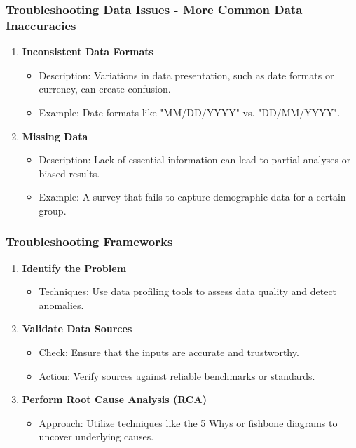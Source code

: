 \documentclass{beamer}
\begin{document}
\begin{frame}[fragile]
    \frametitle{Troubleshooting Data Issues - More Common Data Inaccuracies}
    \begin{enumerate}[resume]
        \item \textbf{Inconsistent Data Formats}
        \begin{itemize}
            \item Description: Variations in data presentation, such as date formats or currency, can create confusion.
            \item Example: Date formats like "MM/DD/YYYY" vs. "DD/MM/YYYY".
        \end{itemize}

        \item \textbf{Missing Data}
        \begin{itemize}
            \item Description: Lack of essential information can lead to partial analyses or biased results.
            \item Example: A survey that fails to capture demographic data for a certain group.
        \end{itemize}
    \end{enumerate}
\end{frame}

\begin{frame}[fragile]
    \frametitle{Troubleshooting Frameworks}
    \begin{enumerate}
        \item \textbf{Identify the Problem}
        \begin{itemize}
            \item Techniques: Use data profiling tools to assess data quality and detect anomalies.
        \end{itemize}
        
        \item \textbf{Validate Data Sources}
        \begin{itemize}
            \item Check: Ensure that the inputs are accurate and trustworthy.
            \item Action: Verify sources against reliable benchmarks or standards.
        \end{itemize}

        \item \textbf{Perform Root Cause Analysis (RCA)}
        \begin{itemize}
            \item Approach: Utilize techniques like the 5 Whys or fishbone diagrams to uncover underlying causes.
        \end{itemize}
    \end{enumerate}
\end{frame}
\end{document}
